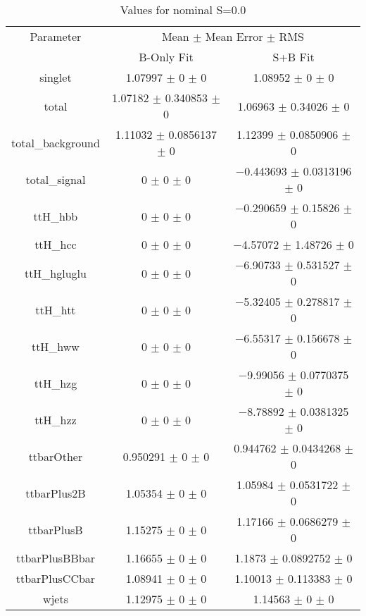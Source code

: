 \begin{table}
\centering
\caption{Values for nominal S=0.0}
\begin{tabular}{ccc}
\toprule
Parameter & \multicolumn{2}{c}{Mean $\pm$ Mean Error $\pm$ RMS}\\
 & B-Only Fit & S+B Fit\\
\midrule
singlet & \num{1.07997} $\pm$ \num{0} $\pm$ \num{0} & \num{1.08952} $\pm$ \num{0} $\pm$ \num{0}\\
total & \num{1.07182} $\pm$ \num{0.340853} $\pm$ \num{0} & \num{1.06963} $\pm$ \num{0.34026} $\pm$ \num{0}\\
total\_background & \num{1.11032} $\pm$ \num{0.0856137} $\pm$ \num{0} & \num{1.12399} $\pm$ \num{0.0850906} $\pm$ \num{0}\\
total\_signal & \num{0} $\pm$ \num{0} $\pm$ \num{0} & \num{-0.443693} $\pm$ \num{0.0313196} $\pm$ \num{0}\\
ttH\_hbb & \num{0} $\pm$ \num{0} $\pm$ \num{0} & \num{-0.290659} $\pm$ \num{0.15826} $\pm$ \num{0}\\
ttH\_hcc & \num{0} $\pm$ \num{0} $\pm$ \num{0} & \num{-4.57072} $\pm$ \num{1.48726} $\pm$ \num{0}\\
ttH\_hgluglu & \num{0} $\pm$ \num{0} $\pm$ \num{0} & \num{-6.90733} $\pm$ \num{0.531527} $\pm$ \num{0}\\
ttH\_htt & \num{0} $\pm$ \num{0} $\pm$ \num{0} & \num{-5.32405} $\pm$ \num{0.278817} $\pm$ \num{0}\\
ttH\_hww & \num{0} $\pm$ \num{0} $\pm$ \num{0} & \num{-6.55317} $\pm$ \num{0.156678} $\pm$ \num{0}\\
ttH\_hzg & \num{0} $\pm$ \num{0} $\pm$ \num{0} & \num{-9.99056} $\pm$ \num{0.0770375} $\pm$ \num{0}\\
ttH\_hzz & \num{0} $\pm$ \num{0} $\pm$ \num{0} & \num{-8.78892} $\pm$ \num{0.0381325} $\pm$ \num{0}\\
ttbarOther & \num{0.950291} $\pm$ \num{0} $\pm$ \num{0} & \num{0.944762} $\pm$ \num{0.0434268} $\pm$ \num{0}\\
ttbarPlus2B & \num{1.05354} $\pm$ \num{0} $\pm$ \num{0} & \num{1.05984} $\pm$ \num{0.0531722} $\pm$ \num{0}\\
ttbarPlusB & \num{1.15275} $\pm$ \num{0} $\pm$ \num{0} & \num{1.17166} $\pm$ \num{0.0686279} $\pm$ \num{0}\\
ttbarPlusBBbar & \num{1.16655} $\pm$ \num{0} $\pm$ \num{0} & \num{1.1873} $\pm$ \num{0.0892752} $\pm$ \num{0}\\
ttbarPlusCCbar & \num{1.08941} $\pm$ \num{0} $\pm$ \num{0} & \num{1.10013} $\pm$ \num{0.113383} $\pm$ \num{0}\\
wjets & \num{1.12975} $\pm$ \num{0} $\pm$ \num{0} & \num{1.14563} $\pm$ \num{0} $\pm$ \num{0}\\
\bottomrule
\end{tabular}
\end{table}